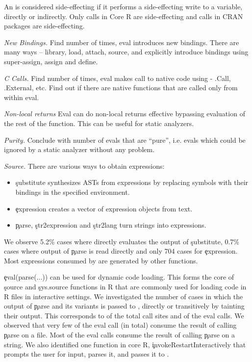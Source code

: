 \documentclass[acmsmall]{acmart}
\newcommand{\mypara}[1]{\medskip\noindent\emph{#1}\xspace}
\begin{document}
An \eval is considered side-effecting if it performs a side-effecting
write to a variable, directly or indirectly. Only
\SideEffectingCoreCallPerc \eval calls in Core R are side-effecting
and \SideEffectingPackageCallPerc \eval calls in CRAN packages are
side-effecting.


\mypara{New Bindings.} Find number of times, eval introduces new
bindings. There are many ways -- library, load, attach, source, and
explicitly introduce bindings using super-assign, assign and define.

\mypara{C Calls.} Find number of times, eval makes call to native code
using - .Call, .External, etc. Find out if there are native functions
that are called only from within eval.

\mypara{Non-local returns}
Eval can do non-local returns effective bypassing evaluation of the
rest of the function. This can be useful for static analyzers.

\mypara{Purity.}
Conclude with number of evals that are ``pure'', i.e. evals which
could be ignored by a static analyzer without any problem.

\mypara{Source.}
There are various ways to obtain expressions:
\begin{itemize}
  \item \c{substitute} synthesizes ASTs from expressions by replacing
    symbols with their bindings in the specified environment.
  \item \c{expression}  creates a vector of expression
    objects from text.
  \item \c{parse}, \c{str2expression} and \c{str2lang} turn strings into
    expressions.
\end{itemize}

We observe 5.2\% cases where \eval directly evaluates the output of
\c{substitute}, 0.7\% cases where output of \c{parse} is read directly
and only 704 cases for \c{expression}. Most expressions consumed by
\eval are generated by other functions.

\c{eval(parse(...))} can be used for dynamic code loading. This forms
the core of \c{source} and \c{sys.source} functions in R that are
commonly used for loading code in R files in interactive settings. We
investigated the number of cases in which the output of \c{parse} and
its variants is passed to \eval, directly or transitively by tainting
their output. This corresponds to \PercentParsedCallSites of the total
\eval call sites and \PercentParsedEvals of the eval calls. We
observed that very few of the eval call (\NbParseFilesRnd in total)
consume the result of calling \c{parse} on a file. Most of the eval
calls consume the result of calling \c{parse} on a string. We also
identified one function in core R, \c{invokeRestartInteractively} that
prompts the user for input, parses it, and passes it to \eval.
\end{document}
